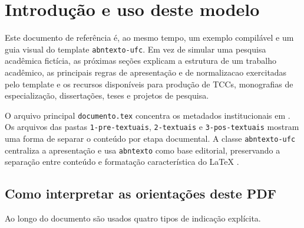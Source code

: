 \section{Introdução e uso deste modelo}\label{sec:introducao}

Este documento de referência é, ao mesmo tempo, um exemplo compilável e um guia visual do \gls{template} \texttt{abntexto-ufc}. Em vez de simular uma pesquisa acadêmica fictícia, as próximas seções explicam a estrutura de um trabalho acadêmico, as principais regras de apresentação e de \gls{normalizacao} exercitadas pelo template e os recursos disponíveis para produção de TCCs, monografias de especialização, dissertações, teses e projetos de pesquisa.

O arquivo principal \texttt{documento.tex} concentra os metadados institucionais em \texttt{\string\ufcsetup}. Os arquivos das pastas \texttt{1-pre-textuais}, \texttt{2-textuais} e \texttt{3-pos-textuais} mostram uma forma de separar o conteúdo por etapa documental. A classe \texttt{abntexto-ufc} centraliza a apresentação e usa \texttt{abntexto} como base editorial, preservando a separação entre conteúdo e formatação característica do \LaTeX{} \parencite{knuth,lamport1994}.

\subsection{Como interpretar as orientações deste PDF}

Ao longo do documento são usados quatro tipos de indicação explícita.





